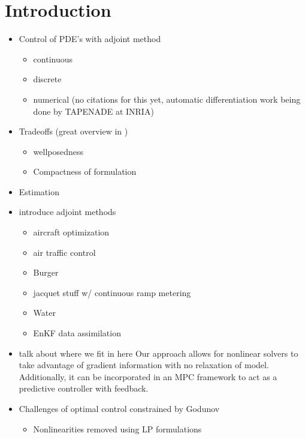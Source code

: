 \section{Introduction}
\begin{itemize}
  \item Control of PDE's with adjoint method \cite{Reuther1996}
  \begin{itemize}
    \item continuous \cite{Strub2006,Reuther1996,Raffard2008}
    \item discrete \cite{Gugat2005}
    \item numerical (no citations for this yet, automatic differentiation work being done by TAPENADE at INRIA)
  \end{itemize}
  \item Tradeoffs (great overview in \cite{Reuther1996})
  \begin{itemize}
    \item wellposedness
    \item Compactness of formulation
  \end{itemize}
  \item Estimation \cite{Raffard2008,Jacquet}
  \item introduce adjoint methods
  \begin{itemize}
    \item aircraft optimization \cite{Giles2000}
    \item air traffic control \cite{Bayen2006}
    \item Burger \cite{Bardos2002}
    \item jacquet stuff w/ continuous ramp metering \cite{Jacquet2005}
    \item Water \cite{Castaings2006,Strub2009}
    \item EnKF data assimilation \cite{Bewley2001,Bewley1998}
  \end{itemize}
  \item talk about where we fit in here
  Our approach allows for nonlinear solvers to take advantage of gradient information with no relaxation of model. Additionally, it can be incorporated in an MPC framework to act as a predictive controller with feedback.
  \item Challenges of optimal control constrained by Godunov
  \begin{itemize}
    \item Nonlinearities removed using LP formulations
    \begin{itemize}

\end{itemize}
\end{itemize}
\end{itemize}

